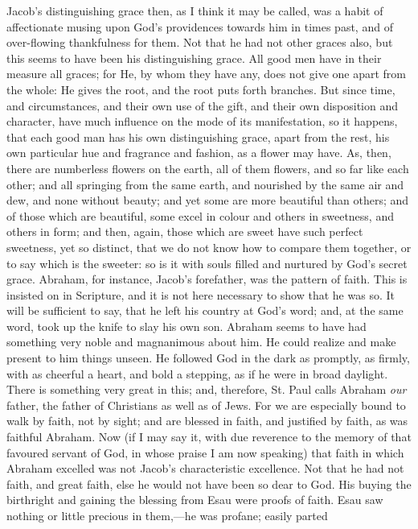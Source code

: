 Jacob's distinguishing grace then, as I think it may be called, was
a habit of affectionate musing upon God's providences towards him in
times past, and of over-flowing thankfulness for them. Not that he had
not other graces also, but this seems to have been his distinguishing
grace. All good men have in their measure all graces; for He, by whom
they have any, does not give one apart from the whole: He gives the
root, and the root puts forth branches. But since time, and
circumstances, and their own use of the gift, and their own
disposition and character, have much influence on the mode of its
manifestation, so it happens, that each good man has his own
distinguishing grace, apart from the rest, his own particular hue and
fragrance and fashion, as a flower may have. As, then, there are
numberless flowers on the earth, all of them flowers, and so far like
each other; and all springing from the same earth, and nourished by
the same air and dew, and none without beauty; and yet some are more
beautiful than others; and of those which are beautiful, some excel in
colour and others in sweetness, and others in form; and then, again,
those which are sweet have such perfect sweetness, yet so distinct,
that we do not know how to compare them together, or to say which is
the sweeter: so is it with souls filled and nurtured by God's secret
grace. Abraham, for instance, Jacob's forefather, was the pattern of
faith. This is insisted on in Scripture, and it is not here necessary
to show that he was so. It will be sufficient to say, that he left his
country at God's word; and, at the same word, took up the knife to
slay his own son. Abraham seems to have had something very noble and
magnanimous about him. He could realize and make present to him things
unseen. He followed God in the dark as promptly, as firmly, with as
cheerful a heart, and bold a stepping, as if he were in broad
daylight. There is something very great in this; and, therefore, St.
Paul calls Abraham \emph{our} father, the father of Christians as well
as of Jews. For we are especially bound to walk by faith, not by
sight; and are blessed in faith, and justified by faith, as was
faithful Abraham. Now (if I may say it, with due reverence to the
memory of that favoured servant of God, in whose praise I am now
speaking) that faith in which Abraham excelled was not Jacob's
characteristic excellence. Not that he had not faith, and great faith,
else he would not have been so dear to God. His buying the birthright
and gaining the blessing from Esau were proofs of faith. Esau saw
nothing or little precious in them,—he was profane; easily parted
